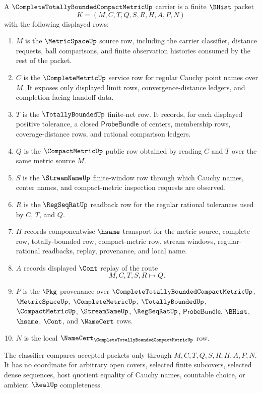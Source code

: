 \begin{definition}
\label{def:complete-totally-bounded-compact-metric-carrier}
A $\CompleteTotallyBoundedCompactMetricUp$ carrier is a finite $\BHist$ packet
$$
K=(M,C,T,Q,S,R,H,A,P,N)
$$
with the following displayed rows:
\begin{enumerate}
\item $M$ is the $\MetricSpaceUp$ source row, including the carrier classifier, distance requests, ball comparisons, and finite observation histories consumed by the rest of the packet.
\item $C$ is the $\CompleteMetricUp$ service row for regular Cauchy point names over $M$. It exposes only displayed limit rows, convergence-distance ledgers, and completion-facing handoff data.
\item $T$ is the $\TotallyBoundedUp$ finite-net row. It records, for each displayed positive tolerance, a closed $\mathsf{ProbeBundle}$ of centers, membership rows, coverage-distance rows, and rational comparison ledgers.
\item $Q$ is the $\CompactMetricUp$ public row obtained by reading $C$ and $T$ over the same metric source $M$.
\item $S$ is the $\StreamNameUp$ finite-window row through which Cauchy names, center names, and compact-metric inspection requests are observed.
\item $R$ is the $\RegSeqRatUp$ readback row for the regular rational tolerances used by $C$, $T$, and $Q$.
\item $H$ records componentwise $\hsame$ transport for the metric source, complete row, totally-bounded row, compact-metric row, stream windows, regular-rational readbacks, replay, provenance, and local name.
\item $A$ records displayed $\Cont$ replay of the route
$$
M,C,T,S,R \longmapsto Q .
$$
\item $P$ is the $\Pkg$ provenance over $\CompleteTotallyBoundedCompactMetricUp$, $\MetricSpaceUp$, $\CompleteMetricUp$, $\TotallyBoundedUp$, $\CompactMetricUp$, $\StreamNameUp$, $\RegSeqRatUp$, $\mathsf{ProbeBundle}$, $\BHist$, $\hsame$, $\Cont$, and $\NameCert$ rows.
\item $N$ is the local $\NameCert_{\CompleteTotallyBoundedCompactMetricUp}$ row.
\end{enumerate}
The classifier compares accepted packets only through $M,C,T,Q,S,R,H,A,P,N$. It has no coordinate for arbitrary open covers, selected finite subcovers, selected dense sequences, host quotient equality of Cauchy names, countable choice, or ambient $\RealUp$ completeness.
\end{definition}

